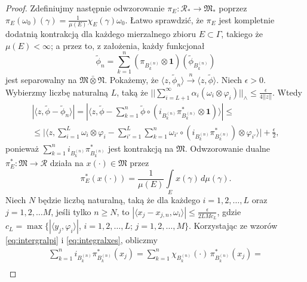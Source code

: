 \begin{proof}
Zdefiniujmy następnie odwzorowanie
$\pi_{E}: \mathcal{R}_{*} \rightarrow \mathfrak{M}_{*}$
poprzez $\pi_{E}(\omega_{0})(\gamma) =\frac{1}{\mu(E)} \chi_{E}(\gamma)\omega_{0}$.
Łatwo sprawdzić, że $\pi_{E}$ jest kompletnie dodatnią kontrakcją dla każdego
mierzalnego zbioru $E \subset \Gamma$, takiego że $\mu(E) < \infty$;
a przez to, z założenia, każdy funkcjonał
\begin{equation}
\tilde{\phi}_{n} = \sum \limits_{k=1}^{n}
(\pi_{B_{k}^{(n)}} \otimes \mathbf{1})
( \tilde{\phi}_{B_{k}^{(n)}} )
\end{equation}
jest separowalny na $\mathfrak{M} \bar{\otimes} \mathfrak{N}$.
Pokażemy, że $\langle z , \tilde{\phi}_{n} \rangle
\stackrel{n}{\rightarrow}\langle z , \tilde{\phi} \rangle$.
Niech $\epsilon > 0$.
Wybierzmy liczbę naturalną $L$, taką że
$|| \sum_{i=L+1}^{\infty}\alpha_i(\omega_{i} \otimes \varphi_{i}) ||_{\wedge}
\leq \frac{\epsilon}{4 ||z||}$.
Wtedy
\begin{eqnarray}
\label{eq:Ineq}
|\langle z, \tilde{\phi} - \tilde{\phi}_{n} \rangle| =
|\langle z, \tilde{\phi} -\sum \limits_{k=1}^{n} \tilde{\phi}
\circ (i_{B_{k}^{(n)}} \pi^{*}_{B_{k}^{(n)}} \otimes \mathbf{1})
\rangle | \leq \nonumber\\
\leq \Big |\langle z,\sum \limits_{i=1}^{L} \omega_{i} \otimes \varphi_{i} -
\sum \limits_{i'=1}^{L}\sum \limits_{k=1}^{n}
\omega_{i'} \circ (i_{B_{k}^{(n)}} \pi^{*}_{B_{k}^{(n)}})
\otimes \varphi_{i'}
\rangle \Big | + \frac{\epsilon}{2},
\end{eqnarray}
ponieważ $\sum_{k=1}^{n} i_{B_{k}^{(n)}} \pi^{*}_{B_{k}^{(n)}}$
jest kontrakcją na $\mathfrak{M}$.
Odwzorowanie dualne
$\pi^{*}_{E}: \mathfrak{M} \rightarrow \mathcal{R}$
działa na $x(\cdot) \in \mathfrak{M}$ przez
\begin{equation}
\label{eq:intergralpi}
\pi^{*}_{E}(x(\cdot)) = \frac{1}{\mu(E)}
\int \limits_{E} x(\gamma) \, d\mu(\gamma).
\end{equation}
Niech $N$ będzie liczbą naturalną, taką że dla każdego $i = 1, 2, \ldots, L$
oraz $j = 1,2, \ldots M$, jeśli tylko $n \geq N$,
to $|\langle x_{j} - x_{j,n}, \omega_{i} \rangle| \leq
\frac{\epsilon}{2 L M c_{L} }$, gdzie
$c_{L} = \max \{ |\langle y_{j}, \varphi_{i} \rangle |$,
$i = 1,2, \ldots, L$; $j = 1,2, \ldots, M \}$.
Korzystając ze wzorów \eqref{eq:intergralpi} i \eqref{eq:integralxes},
obliczmy
\begin{eqnarray}
\sum \limits_{k=1}^{n} i_{B_{k}^{(n)}} \pi^{*}_{B_{k}^{(n)}} (x_{j})
=\sum \limits_{k=1}^{n} \chi_{B_{k}^{(n)}}(\cdot) \,
\pi^{*}_{B_{k}^{(n)}} (x_{j}) = \nonumber\\

\end{eqnarray}
\end{proof}
